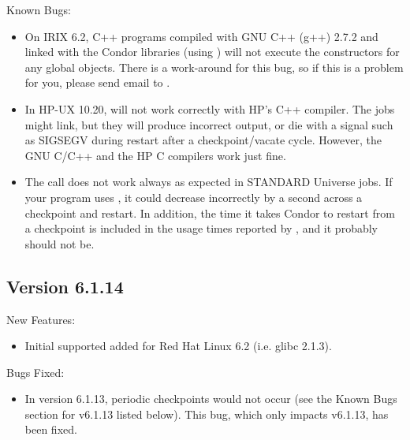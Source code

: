 \noindent Known Bugs:

\begin{itemize}

\item On IRIX 6.2, C++ programs compiled with GNU C++ (g++) 2.7.2 and
linked with the Condor libraries (using ) will not
execute the constructors for any global objects.
There is a work-around for this bug, so if this is a problem for you,
please send email to .

\item In HP-UX 10.20,  will not work correctly with HP's
C++ compiler. 
The jobs might link, but they will produce incorrect output, or die with
a signal such as SIGSEGV during restart after a checkpoint/vacate cycle.
However, the GNU C/C++ and the HP C compilers work just fine.

\item The  call does not work always as expected in
STANDARD Universe jobs.  
If your program uses , it 
could decrease incorrectly by a second
across a checkpoint and restart.  In addition, the time it takes
Condor to restart from a checkpoint is included in the usage times
reported by , and it probably should not be.

\end{itemize}


\subsection{\label{sec:New-6-1-14}Version 6.1.14}

\noindent New Features:

\begin{itemize}

\item Initial supported added for Red Hat Linux 6.2 (i.e. glibc 2.1.3).

\end{itemize}

\noindent Bugs Fixed:

\begin{itemize}

\item In version 6.1.13, periodic checkpoints would not occur (see the
Known Bugs section for v6.1.13 listed below).  This bug, which only
impacts v6.1.13, has been fixed.

\end{itemize}

